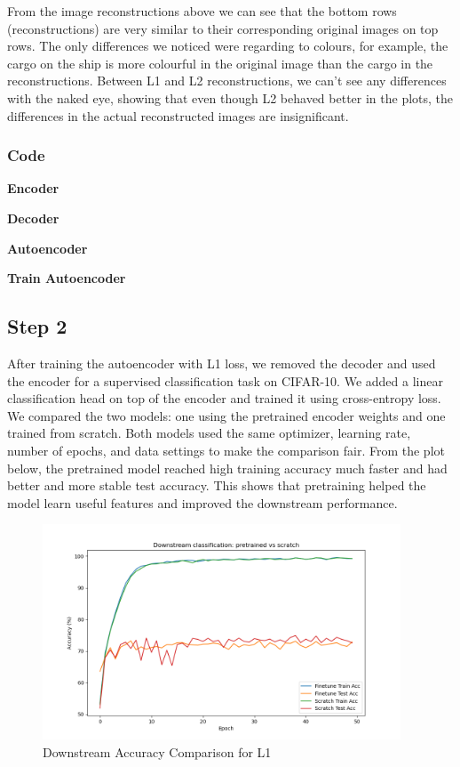 From the image reconstructions above we can see that the bottom rows (reconstructions) are very similar to their corresponding original images on top rows. The only differences we noticed were regarding to colours, for example, the cargo on the ship is more colourful in the original image than the cargo in the reconstructions. Between L1 and L2 reconstructions, we can't see any differences with the naked eye, showing that even though L2 behaved better in the plots, the differences in the actual reconstructed images are insignificant.

\subsubsection{Code}

\textbf{Encoder}


\textbf{Decoder}


\textbf{Autoencoder}


\textbf{Train Autoencoder}


\subsection{Step 2}

After training the autoencoder with L1 loss, we removed the decoder and used the encoder for a supervised classification task on CIFAR-10. We added a linear classification head on top of the encoder and trained it using cross-entropy loss. We compared the two models: one using the pretrained encoder weights and one trained from scratch. Both models used the same optimizer, learning rate, number of epochs, and data settings to make the comparison fair. From the plot below, the pretrained model reached high training accuracy much faster and had better and more stable test accuracy. This shows that pretraining helped the model learn useful features and improved the downstream performance.

\begin{figure}[H] 
    \centering
    \includegraphics[width=0.95\textwidth]{images/ex_1/ex1_downstream_accuracy_comparison} 
    \caption{Downstream Accuracy Comparison for L1}
\end{figure}

